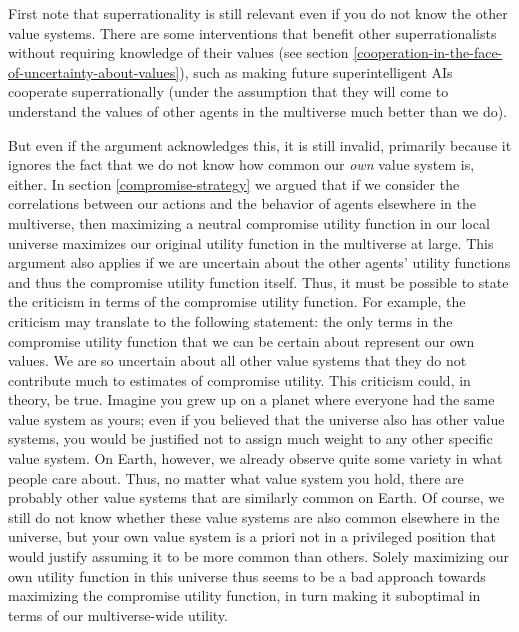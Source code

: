 First note that superrationality is still relevant even if you do not
know the other value systems. There are some interventions that benefit
other superrationalists without requiring knowledge of their values (see
section
\ref{cooperation-in-the-face-of-uncertainty-about-values}), such as
making future superintelligent AIs cooperate superrationally (under the
assumption that they will come to understand the values of other agents
in the multiverse much better than we do).

But even if the argument acknowledges this, it is still invalid,
primarily because it ignores the fact that we do not know how common our
\emph{own} value system is, either. In section
\ref{compromise-strategy}
we argued that if we consider the correlations between our actions and
the behavior of agents elsewhere in the multiverse, then maximizing a
neutral compromise utility function in our local universe maximizes our
original utility function in the multiverse at large. This argument also
applies if we are uncertain about the other agents' utility functions
and thus the compromise utility function itself. Thus, it must be
possible to state the criticism in terms of the compromise utility
function. For example, the criticism may translate to the following
statement: the only terms in the compromise utility function that we can
be certain about represent our own values. We are so uncertain about all
other value systems that they do not contribute much to estimates of
compromise utility. This criticism could, in theory, be true. Imagine
you grew up on a planet where everyone had the same value system as
yours; even if you believed that the universe also has other value
systems, you would be justified not to assign much weight to any other
specific value system. On Earth, however, we already observe quite some
variety in what people care about. Thus, no matter what value system you
hold, there are probably other value systems that are similarly common
on Earth. Of course, we still do not know whether these value systems
are also common elsewhere in the universe, but your own value system is
a priori not in a privileged position that would justify assuming it to
be more common than others. Solely maximizing our own utility function
in this universe thus seems to be a bad approach towards maximizing the
compromise utility function, in turn making it suboptimal in terms of
our multiverse-wide utility.
